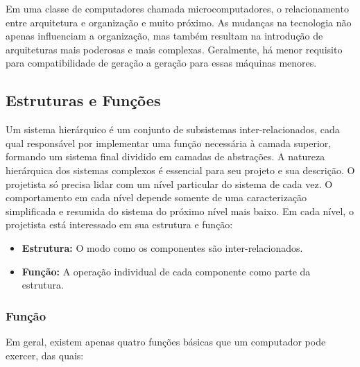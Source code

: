 \documentclass{article}
\begin{document}
Em uma classe de computadores chamada microcomputadores, o relacionamento entre
arquitetura e organização e muito próximo. As mudanças na tecnologia não apenas
influenciam a organização, mas também resultam na introdução de arquiteturas
mais poderosas e mais complexas. Geralmente, há menor requisito para
compatibilidade de geração a geração para essas máquinas menores.

\subsection{Estruturas e Funções}
Um sistema hierárquico é um conjunto de subsistemas inter-relacionados, cada
qual responsável por implementar uma função necessária à camada superior,
formando um sistema final dividido em camadas de abstrações. A natureza
hierárquica dos sistemas complexos é essencial para seu projeto e sua
descrição. O projetista só precisa lidar com um nível particular do sistema de
cada vez. O comportamento em cada nível depende somente de uma
caracterização simplificada e resumida do sistema do próximo nível mais baixo.
Em cada nível, o projetista está interessado em sua estrutura e função:

\begin{itemize}
    \item \textbf{Estrutura:} O modo como os componentes são inter-relacionados.
    \item \textbf{Função:} A operação individual de cada componente como parte
        da estrutura.
\end{itemize}

\subsubsection{Função}
Em geral, existem apenas quatro funções básicas que um computador pode exercer,
das quais:
\end{document}
